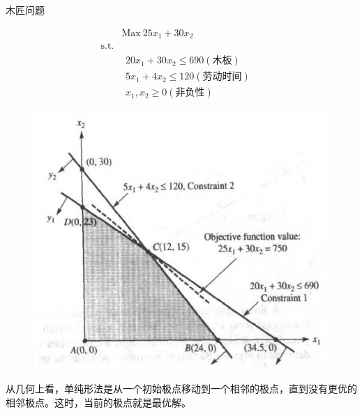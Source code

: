 \documentclass[UTF8]{ctexbeamer}
\begin{document}
\begin{frame}{木匠问题}
  \begin{figure}
    \begin{minipage}{.5\linewidth}
      \[ 
      \begin{array}{lcl}
        & \mbox{Max}\ 25x_1 + 30x_2 & \\
        \mbox{s.t.} & &  \\
        &
        \begin{array}{c}
          20x_1 + 30x_2 \le 690 (\text{木板})\\
          5x_1 + 4x_2 \le 120 (\text{劳动时间})\\
          x_1, x_2 \ge 0 (\text{非负性})
        \end{array}
        &
      \end{array}
      \]
    \end{minipage}%
    \begin{minipage}{.5\linewidth}
      \includegraphics[width=\textwidth{}]{wood.png}    
    \end{minipage}
  \end{figure}

  \begin{block}{}
    从几何上看，单纯形法是从一个初始极点移动到一个相邻的极点，直到没有更优的相邻极点。这时，当前的极点就是最优解。
  \end{block}
\end{frame}
\end{document}
